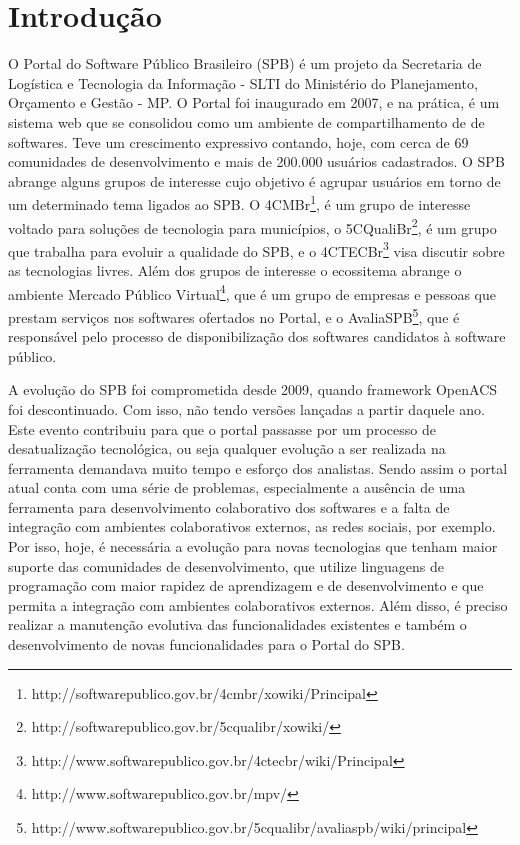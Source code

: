 \section{Introdução}
\label{sec:introducao}

O Portal do Software Público Brasileiro (SPB) é um projeto da Secretaria de Logística e Tecnologia da Informação - SLTI do Ministério do Planejamento, Orçamento e Gestão - MP. O Portal foi inaugurado em 2007, e na prática,
é um sistema web que se consolidou como um ambiente de compartilhamento de
de softwares. 
%
%
Teve um crescimento expressivo contando, hoje, com cerca de 69 comunidades de
desenvolvimento e mais de 200.000 usuários cadastrados.
%
O SPB abrange alguns grupos de interesse cujo objetivo é agrupar usuários em torno de um determinado tema ligados ao SPB. O 4CMBr\footnote{http://softwarepublico.gov.br/4cmbr/xowiki/Principal}, é um grupo de interesse voltado para soluções
de tecnologia para municípios, o 5CQualiBr\footnote{http://softwarepublico.gov.br/5cqualibr/xowiki/}, é um grupo que trabalha para
evoluir a qualidade do SPB, e o 4CTECBr\footnote{http://www.softwarepublico.gov.br/4ctecbr/wiki/Principal} visa discutir sobre as tecnologias livres.
%
Além dos grupos de interesse o ecossitema abrange o ambiente Mercado Público Virtual\footnote{http://www.softwarepublico.gov.br/mpv/}, que é um
grupo de empresas e pessoas que prestam serviços nos softwares ofertados no
Portal, e o AvaliaSPB\footnote{http://www.softwarepublico.gov.br/5cqualibr/avaliaspb/wiki/principal}, que é responsável pelo processo de disponibilização dos softwares candidatos à software
público.
%

A evolução do SPB foi comprometida desde 2009, quando framework OpenACS foi 
descontinuado. Com isso, não tendo versões lançadas a partir daquele ano.
%
Este evento contribuiu para que o portal passasse por um processo de desatualização tecnológica, ou seja qualquer evolução a ser realizada na ferramenta demandava muito tempo e esforço dos analistas. Sendo assim o portal atual conta com uma série de problemas, especialmente a ausência de uma ferramenta para desenvolvimento colaborativo dos softwares e a falta de integração com ambientes colaborativos
externos, as redes sociais, por exemplo.
Por isso, hoje, é necessária a evolução para novas tecnologias que tenham maior
suporte das comunidades de desenvolvimento, que utilize linguagens de programação
com maior rapidez de aprendizagem e de desenvolvimento e que permita a integração
com ambientes colaborativos externos.
%
Além disso, é preciso realizar a manutenção evolutiva das funcionalidades
existentes e também o desenvolvimento de novas funcionalidades para o Portal
do SPB.
%

